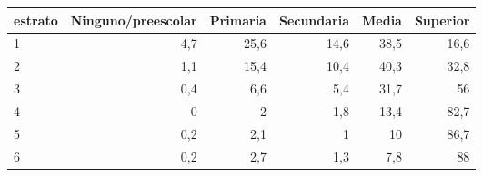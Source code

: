 \begin{tabular}{lrrrrr}
\toprule
estrato & Ninguno/preescolar & Primaria & Secundaria & Media & Superior \\
\midrule
1 & 4,7 & 25,6 & 14,6 & 38,5 & 16,6 \\
2 & 1,1 & 15,4 & 10,4 & 40,3 & 32,8 \\
3 & 0,4 & 6,6 & 5,4 & 31,7 & 56 \\
4 & 0 & 2 & 1,8 & 13,4 & 82,7 \\
5 & 0,2 & 2,1 & 1 & 10 & 86,7 \\
6 & 0,2 & 2,7 & 1,3 & 7,8 & 88 \\
\bottomrule
\end{tabular}
